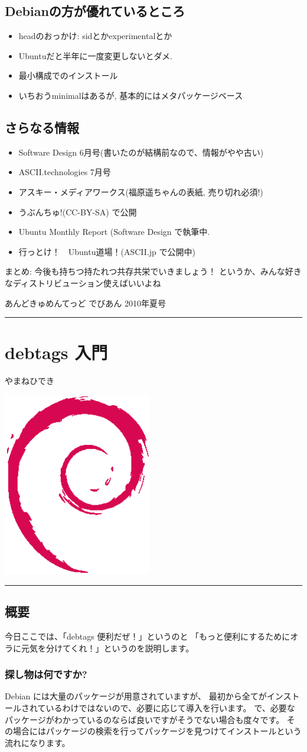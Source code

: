 \documentclass[mingoth,a4paper]{jsarticle}
\renewcommand{\dancersection}[2]{%
\newpage
あんどきゅめんてっど でびあん 2010年夏号
%
\vspace{0.1mm}\\
{\color{dancerlightblue}\rule{\hsize}{2mm}}

%
%
\begin{minipage}[t]{0.6\hsize}
\color{dancerdarkblue}
\vspace{1cm}
\section{#1}
\hfill{}#2\\
\end{minipage}
\begin{minipage}[t]{0.4\hsize}
\vspace{-2cm}
\hfill{}\includegraphics[height=8cm]{image200502/openlogo-nd.eps}\\
\vspace{-5cm}
\end{minipage}
%
%
{\color{dancerdarkblue}\rule{0.74\hsize}{2mm}}
%
\vspace{2cm}
}
\begin{document}
\begin{multicols}{2}
  \subsection{Debianの方が優れているところ}
  \begin{itemize}
        \item headのおっかけ: sidとかexperimentalとか
        \item Ubuntuだと半年に一度変更しないとダメ.
        \item 最小構成でのインストール
        \item いちおうminimalはあるが,
      基本的にはメタパッケージベース
  \end{itemize}


  \subsection{さらなる情報}
  \begin{itemize}
        \item Software Design 6月号(書いたのが結構前なので、情報がやや古い)
        \item ASCII.technologies 7月号
        \item アスキー・メディアワークス(福原遥ちゃんの表紙, 売り切れ必須!)
        \item うぶんちゅ!(CC-BY-SA) で公開
        \item Ubuntu Monthly Report (Software Design で執筆中. 
        \item 行っとけ！　Ubuntu道場！(ASCII.jp で公開中)
  \end{itemize}
  

まとめ: 
今後も持ちつ持たれつ共存共栄でいきましょう！
というか、みんな好きなディストリビューション使えばいいよね

\end{multicols}

\dancersection{debtags 入門}{やまねひでき}
\subsection{概要}
今日ここでは、「debtags 便利だぜ！」というのと
「もっと便利にするためにオラに元気を分けてくれ！」というのを説明します。

\subsubsection{探し物は何ですか?}
Debian には大量のパッケージが用意されていますが、
最初から全てがインストールされているわけではないので、必要に応じて導入を行います。
で、必要なパッケージがわかっているのならば良いですがそうでない場合も度々です。
その場合にはパッケージの検索を行ってパッケージを見つけてインストールという流れになります。
\end{document}
